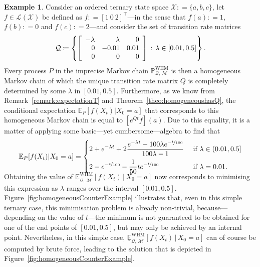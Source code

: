\documentclass[10pt,a4paper]{paper}
\theoremstyle{definition}
\newtheorem{exmp}{Example}
\newcommand{\states}{\mathcal{X}}
\newcommand{\processes}{\mathbb{P}}
\newcommand{\whmprocesses}{\processes^{\mathrm{WHM}}}
\newcommand{\gambles}{\mathcal{L}}
\newcommand{\gamblesX}{\gambles(\states)}
\newcommand{\rateset}{\mathcal{Q}}
\newcommand{\coloneqq}{:\!=}
\begin{document}
\begin{exmp}\label{ex:homogeneousexample}
Consider an ordered ternary state space $\states\coloneqq \{a,b,c\}$,  let $f\in\gamblesX$ be defined as $f\coloneqq [1~0~2]^\top$---in the sense that $f(a)\coloneqq1$, $f(b)\coloneqq0$ and $f(c)\coloneqq2$---and consider the set of transition rate matrices
\vspace{4pt}
\begin{equation*}
\rateset \coloneqq \left\{ \left[\begin{array}{rrr}
-\lambda & \lambda & 0 \\
0 & -0.01 & 0.01 \\
0 & 0 & 0
\end{array}\right] \,:\,\lambda\in[0.01,0.5]\right\}.
\vspace{4pt}
\end{equation*}
Every process $P$ in the imprecise Markov chain $\whmprocesses_{\rateset,\,\mathcal{M}}$ is then a homogeneous Markov chain of which the unique transition rate matrix $Q$ is completely determined by some $\lambda$ in $[0.01,0.5]$. Furthermore, as we know from Remark~\ref{remark:expectationT} and Theorem~\ref{theo:homogeneoushasQ}, the conditional expectation $\mathbb{E}_P[f(X_t)\vert X_0=a]$ that corresponds to this homogeneous Markov chain is equal to $[e^{Q t}f](a)$. Due to this equality, it is a matter of applying some basic---yet cumbersome---algebra to find that 
\begin{align*}
\mathbb{E}_P[f(X_t)\vert X_0=a]
=
\begin{cases}
\displaystyle
2+e^{-\lambda t}+2\frac{e^{-\lambda t}-100\lambda e^{-\nicefrac{t}{100}}}{100\lambda-1}&\text{ if $\lambda\in(0.01,0.5]$}\\[8pt]
\displaystyle
2-e^{-\nicefrac{t}{100}}-\frac{1}{50}te^{-\nicefrac{t}{100}}&\text{ if $\lambda=0.01$.}
\end{cases}\\[-10pt]
\end{align*}
Obtaining the value of $\underline{\mathbb{E}}_{\rateset,\,\mathcal{M}}^{\mathrm{WHM}}[f(X_t)\,\vert\,X_0=a]$ now corresponds to minimising this expression as $\lambda$ ranges over the interval $[0.01,0.5]$. Figure~\ref{fig:homogeneousCounterExample} illustrates that, even in this simple ternary case, this minimisation problem is already non-trivial, because---depending on the value of $t$---the minimum is not guaranteed to be obtained for one of the end points of $[0.01,0.5]$, but may only be achieved by an internal point. Nevertheless, in this simple case, $\underline{\mathbb{E}}_{\rateset,\,\mathcal{M}}^{\mathrm{WHM}}[f(X_t)\,\vert\,X_0=a]$ can of course be computed by brute force, leading to the solution that is depicted in Figure~\ref{fig:homogeneousCounterExample}. 


\end{exmp}
\end{document}
